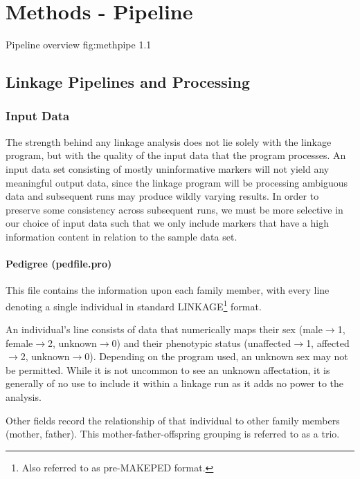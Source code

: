 \chapter{Methods - Pipeline}

	{Pipeline overview}
	{fig:methpipe}
	{1.1}

\section{Linkage Pipelines and Processing}



\subsection{Input Data}

The strength behind any linkage analysis does not lie solely with the linkage program, but with the quality of the input data that the program processes. An input data set consisting of mostly uninformative markers will not yield any meaningful output data, since the linkage program will be processing ambiguous data and subsequent runs may produce wildly varying results. In order to preserve some consistency across subsequent runs, we must be more selective in our choice of input data such that we only include markers that have a high information content in relation to the sample data set.

\subsubsection{Pedigree (pedfile.pro)}

This file contains the information upon each family member, with every line denoting a single individual in standard LINKAGE\footnote{Also referred to as pre-MAKEPED format.} format. 

An individual's line consists of data that numerically maps their sex ({male\(\rightarrow\)1, female\(\rightarrow\)2,  unknown\(\rightarrow\)0}) and their phenotypic status ({unaffected\(\rightarrow\)1, affected\(\rightarrow\)2,  unknown\(\rightarrow\)0}). Depending on the program used, an unknown sex may not be permitted. While it is not uncommon to see an unknown affectation, it is generally of no use to include it within a linkage run as it adds no power to the analysis. 

Other fields record the relationship of that individual to other family members (mother, father). This mother-father-offspring grouping is referred to as a \gls{trio}. 

